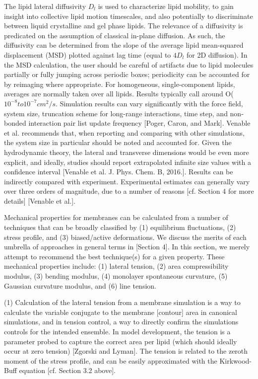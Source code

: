 \documentclass[9pt,bestpractices]{livecoms}
\begin{document}
The lipid lateral diffusivity $D_l$ is used to characterize lipid mobility, to gain insight into collective lipid motion timescales, and also potentially to discriminate between liquid crystalline and gel phase lipids.
The relevance of a diffusivity is predicated on the assumption of classical in-plane diffusion.
As such, the diffusivity can be determined from the slope of the average lipid mean-squared displacement (MSD) plotted against lag time (equal to $4D_l$ for 2D diffusion).
In the MSD calculation, the user should be careful of artifacts due to lipid molecules partially or fully jumping across periodic boxes; periodicity can be accounted for by reimaging where appropriate.
For homogeneous, single-component lipids, averages are normally taken over all lipids.
Results typically call around O($10^{-8} to 10^{-7} cm^2/s$.
Simulation results can vary significantly with the force field, system size, truncation scheme for long-range interactions, time step, and non-bonded interaction pair list update frequency [Poger, Caron, and Mark].
Venable et al. recommends that, when reporting and comparing with other simulations, the system size in particular should be noted and accounted for.
Given the hydrodynamic theory, the lateral and transverse dimensions would be even more explicit, and ideally, studies should report extrapolated infinite size values with a confidence interval [Venable et al. J. Phys. Chem. B, 2016.].
Results can be indirectly compared with experiment.
Experimental estimates can generally vary over three orders of magnitude, due to a number of reasons [cf. Section 4 for more details] [Venable et al.].

Mechanical properties for membranes can be calculated from a number of techniques that can be broadly classified by (1) equilibrium fluctuations, (2) stress profile, and (3) biased/active deformations.
We discuss the merits of each umbrella of approaches in general terms in [Section 4].
In this section, we merely attempt to recommend the best technique(s) for a given property.
These mechanical properties include: (1) lateral tension, (2) area compressibility modulus, (3) bending modulus, (4) monolayer spontaneous curvature, (5) Gaussian curvature modulus, and (6) line tension.

(1) Calculation of the lateral tension from a membrane simulation is a way to calculate the variable conjugate to the membrane [contour] area in canonical simulations, and in tension control, a way to directly confirm the simulations controls for the intended ensemble.
In model development, the tension is a parameter probed to capture the correct area per lipid (which should ideally occur at zero tension) [Zgorski and Lyman].
The tension is related to the zeroth moment of the stress profile, and can be easily approximated with the Kirkwood-Buff equation [cf. Section 3.2 above].
\end{document}
